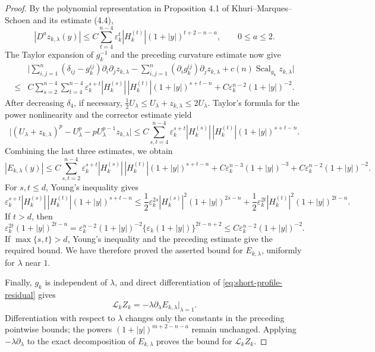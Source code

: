 \documentclass[11pt]{article}
\numberwithin{equation}{section}
\theoremstyle{remark}
\begin{document}
\begin{proof}
By the polynomial representation in Proposition  4.1 of
Khuri--Marques--Schoen \cite{KMS}  and its estimate  (4.4),
{
\[
 |D^az_{k,\lambda}(y)|
 \le C\sum_{t=4}^{n-4}\varepsilon_k^t|H_k^{(t)}|
 (1+|y|)^{t+2-n-a},
 \qquad 0\le a\le2.
\]
}
The Taylor expansion of $g_k^{-1}$ and the preceding curvature estimate
now give
{
\begin{equation*}
\begin{aligned}
&\Bigg|
 \sum_{i,j=1}^n(\delta_{ij}-g_k^{ij})
       \partial_i\partial_jz_{k,\lambda}
 -\sum_{i,j=1}^n(\partial_i g_k^{ij})
       \partial_jz_{k,\lambda}
 +c(n)\operatorname{Scal}_{g_k}z_{k,\lambda}\Bigg|\\
\le{}&C\sum_{s=2}^{n-4}\sum_{t=4}^{n-4}
 \varepsilon_k^{s+t}|H_k^{(s)}|\,|H_k^{(t)}|
 (1+|y|)^{s+t-n}
+C\varepsilon_k^{n-2}(1+|y|)^{-2}.
\end{aligned}
\end{equation*}
}
After decreasing $\delta_4$, if necessary,
$\frac{1}{2}U_\lambda\le U_\lambda+z_{k,\lambda}\le2U_\lambda$.
Taylor's formula for the power nonlinearity
and the corrector estimate yield
{
\begin{equation*}
\big|(U_\lambda+z_{k,\lambda})^p-U_\lambda^p
 -pU_\lambda^{p-1}z_{k,\lambda}\big|
\le{}C\sum_{s,t=4}^{n-4}
 \varepsilon_k^{s+t}|H_k^{(s)}|\,|H_k^{(t)}|
 (1+|y|)^{s+t-n}.
\end{equation*}
}
Combining the last three estimates, we obtain
{
\begin{equation*}
 |E_{k,\lambda}(y)|
\le{}C\sum_{s,t=2}^{n-4}
 \varepsilon_k^{s+t}|H_k^{(s)}|\,|H_k^{(t)}|
 (1+|y|)^{s+t-n}
 +C\varepsilon_k^{n-3}(1+|y|)^{-3}
 +C\varepsilon_k^{n-2}(1+|y|)^{-2}.
\end{equation*}
}
For  $s,t\le d$, Young's inequality gives
{
\[
\varepsilon_k^{s+t}|H_k^{(s)}|\,|H_k^{(t)}|
 (1+|y|)^{s+t-n}
\le{}\frac12\varepsilon_k^{2s}|H_k^{(s)}|^2
 (1+|y|)^{2s-n}
 +\frac12\varepsilon_k^{2t}|H_k^{(t)}|^2
 (1+|y|)^{2t-n}.
\]
}
 If $t>d$, then
{
\[
 \varepsilon_k^{2t}(1+|y|)^{2t-n}
 =\varepsilon_k^{n-2}(1+|y|)^{-2}
  \{\varepsilon_k(1+|y|)\}^{2t-n+2}
 \le C\varepsilon_k^{n-2}(1+|y|)^{-2}.
\]
}
If $\max\{s,t\}>d$, Young's inequality and the preceding estimate give the
required bound.  We have therefore proved the asserted bound for
$E_{k,\lambda}$, uniformly for $\lambda$ near $1$.

 Finally, $g_k$ is independent of $\lambda$, and direct differentiation of
\eqref{eq:short-profile-residual} gives
{
\[
 \mathcal L_kZ_k
 =-\lambda\partial_\lambda E_{k,\lambda}
  \big|_{\lambda=1}.
\]
}
 Differentiation with respect to $\lambda$ changes only the constants in the
preceding pointwise bounds; the powers $(1+|y|)^{m+2-n-a}$ remain unchanged.
Applying $-\lambda\partial_\lambda$ to the exact decomposition of
$E_{k,\lambda}$ proves the bound for $\mathcal L_kZ_k$.
\end{proof}
\end{document}
